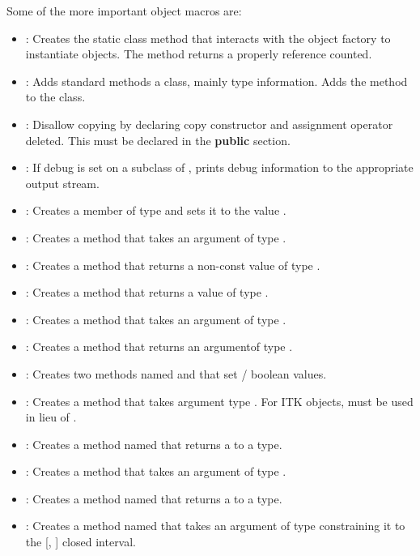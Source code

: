 Some of the more important object macros are:
\begin{itemize}
\item {}: Creates the static class method 
that interacts with the object factory to instantiate objects. The method
returns a  properly reference counted.
\item {}: Adds standard methods a
class, mainly type information. Adds the  method to the
class.
\item {}: Disallow copying by
declaring copy constructor and assignment operator deleted. This must be
declared in the \textbf{public} section.
\item {}: If debug is set on a subclass of
, prints debug information to the appropriate output
stream.
\item {}: Creates a
 member of type  and sets it to the value
.
\item {}: Creates a method  that
takes an argument of type .
\item {}: Creates a method  that
returns a non-const value of type .
\item {}: Creates a method 
that returns a  value of type .
\item {}: Creates a method  that
takes an argument of type .
\item {}: Creates a method  that
returns an argumentof  type .
\item {}: Creates two methods named  and
 that set / boolean values.
\item {}: Creates a method 
that takes argument type . For ITK objects,
 must be used in lieu of .
\item {}: Creates a method named
 that returns a  to a  type.
\item {}: Creates a method
 that takes an argument of type .
\item {}: Creates a method named
 that returns a   to a
 type.
\item {}: Creates a method named
 that takes an argument of type  constraining it
to the [, ] closed interval.
\end{itemize}

